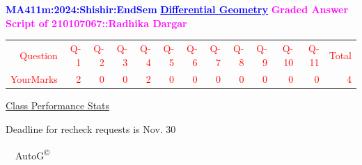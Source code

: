 \documentclass{article}                              %
\begin{document}
%
\vspace*{1in}

\begin{center}
	\textbf{\textcolor{blue}{\LARGE MA411m:2024:Shishir:EndSem}}
	\vskip 1cm
	\textbf{\textcolor{blue}{\underline{\Large Differential Geometry}}}
	\vskip 1cm
	\textbf{\textcolor{magenta}{\LARGE Graded Answer Script of 210107067::Radhika Dargar}}
\end{center}


\begin{center}
	\Huge 
	\textcolor{red}{
	\begin{tabular}{*{13}{r}}
		Question&Q-1& Q-2& Q-3& Q-4& Q-5& Q-6& Q-7& Q-8& Q-9& Q-10& Q-11&Total  \\
        	YourMarks&2&0&0&2&0&0&0&0&0&0&0&4
	\end{tabular}
	}
        \vskip 2cm
	\large
	\underline{Class Performance Stats}
	\DTLsetseparator{;}
	\begin{table}[htbp]
		\centering
	\end{table}
	\vskip 1cm
	Deadline for recheck requests is Nov. 30
\end{center}
\ \vfill \ \hfill \small AutoG\textsuperscript{\copyright}
\newpage
%
\end{document}

